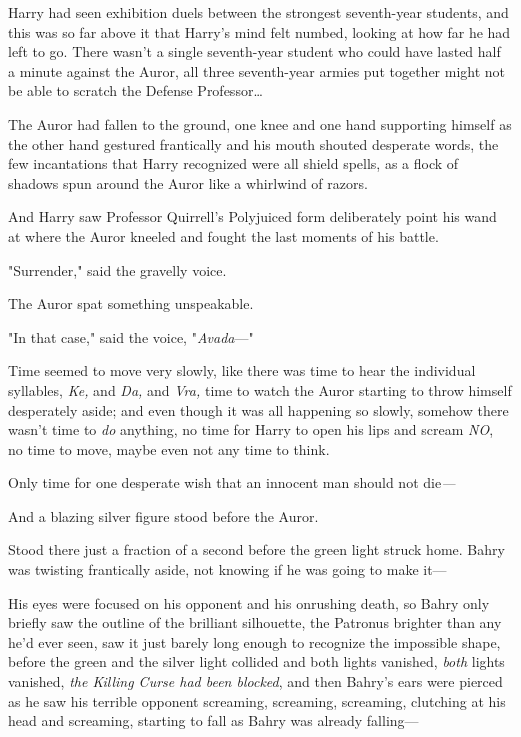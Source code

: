 Harry had seen exhibition duels between the strongest seventh-year students, 
and this was so far above it that Harry's mind felt numbed, looking at how far 
he had left to go. There wasn't a single seventh-year student who could have 
lasted half a minute against the Auror, all three seventh-year armies put 
together might not be able to scratch the Defense Professor{\ldots}

The Auror had fallen to the ground, one knee and one hand supporting himself as 
the other hand gestured frantically and his mouth shouted desperate words, the 
few incantations that Harry recognized were all shield spells, as a flock of 
shadows spun around the Auror like a whirlwind of razors.

And Harry saw Professor Quirrell's Polyjuiced form deliberately point his wand 
at where the Auror kneeled and fought the last moments of his battle.

"Surrender," said the gravelly voice.

The Auror spat something unspeakable.

"In that case," said the voice, "\emph{Avada}---"

Time seemed to move very slowly, like there was time to hear the individual 
syllables, \emph{Ke,} and \emph{Da,} and \emph{Vra,} time to watch the Auror 
starting to throw himself desperately aside; and even though it was all 
happening so slowly, somehow there wasn't time to \emph{do} anything, no time 
for Harry to open his lips and scream \emph{NO}, no time to move, maybe even 
not any time to think.

Only time for one desperate wish that an innocent man should not die\emph{---}

And a blazing silver figure stood before the Auror.

Stood there just a fraction of a second before the green light struck home.
\sbreak
Bahry was twisting frantically aside, not knowing if he was going to make it---

His eyes were focused on his opponent and his onrushing death, so Bahry only 
briefly saw the outline of the brilliant silhouette, the Patronus brighter than 
any he'd ever seen, saw it just barely long enough to recognize the impossible 
shape, before the green and the silver light collided and both lights vanished, 
\emph{both} lights vanished, \emph{the Killing Curse had been blocked}, and 
then Bahry's ears were pierced as he saw his terrible opponent screaming, 
screaming, screaming, clutching at his head and screaming, starting to fall as 
Bahry was already falling---

